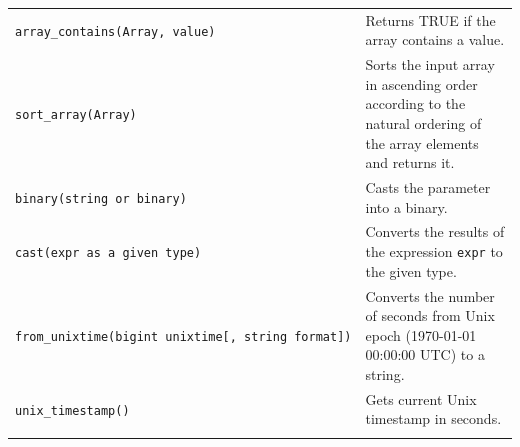 \documentclass[
]{article}
\begin{document}
\begin{longtable}[]{@{}ll@{}}
\begin{minipage}[t]{0.39\columnwidth}\raggedright
\texttt{array\_contains(Array,\ value)}\strut
\end{minipage} & \begin{minipage}[t]{0.55\columnwidth}\raggedright
Returns TRUE if the array contains a value.\strut
\end{minipage}\tabularnewline
\begin{minipage}[t]{0.39\columnwidth}\raggedright
\texttt{sort\_array(Array)}\strut
\end{minipage} & \begin{minipage}[t]{0.55\columnwidth}\raggedright
Sorts the input array in ascending order according to the natural
ordering of the array elements and returns it.\strut
\end{minipage}\tabularnewline
\begin{minipage}[t]{0.39\columnwidth}\raggedright
\texttt{binary(string\ or\ binary)}\strut
\end{minipage} & \begin{minipage}[t]{0.55\columnwidth}\raggedright
Casts the parameter into a binary.\strut
\end{minipage}\tabularnewline
\begin{minipage}[t]{0.39\columnwidth}\raggedright
\texttt{cast(expr\ as\ a\ given\ type)}\strut
\end{minipage} & \begin{minipage}[t]{0.55\columnwidth}\raggedright
Converts the results of the expression \texttt{expr} to the given
type.\strut
\end{minipage}\tabularnewline
\begin{minipage}[t]{0.39\columnwidth}\raggedright
\texttt{from\_unixtime(bigint\ unixtime{[},\ string\ format{]})}\strut
\end{minipage} & \begin{minipage}[t]{0.55\columnwidth}\raggedright
Converts the number of seconds from Unix epoch (1970-01-01 00:00:00 UTC)
to a string.\strut
\end{minipage}\tabularnewline
\begin{minipage}[t]{0.39\columnwidth}\raggedright
\texttt{unix\_timestamp()}\strut
\end{minipage} & \begin{minipage}[t]{0.55\columnwidth}\raggedright
Gets current Unix timestamp in seconds.\strut
\end{minipage}\tabularnewline
\begin{minipage}[t]{0.39\columnwidth}\raggedright

\end{minipage}
\end{longtable}
\end{document}
